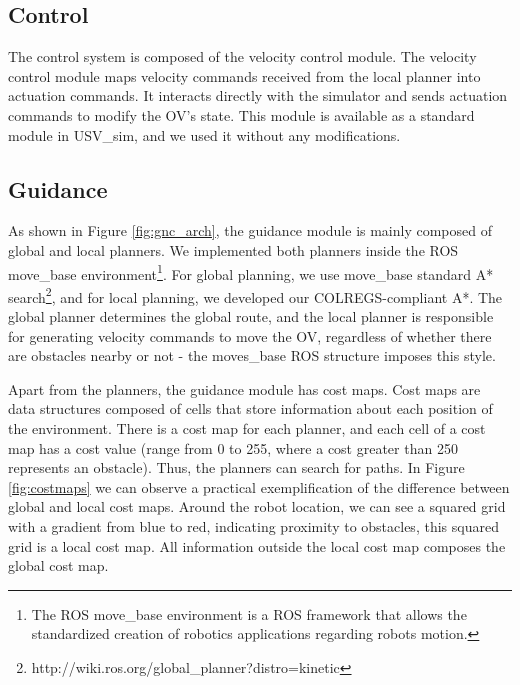     \subsection{Control}
    \label{sec:chap4_control}
    
        The control system is composed of the velocity control module. The velocity control module maps velocity commands received from the local planner into actuation commands. It interacts directly with the simulator and sends actuation commands to modify the \ac{OV}'s state.  This module is available as a standard module in USV\_sim, and we used it without any modifications.
        
    \subsection{Guidance}
    \label{sec:chap4_guidance}

        As shown in Figure \ref{fig:gnc_arch}, the guidance module is mainly composed of global and local planners. We implemented both planners inside the ROS move\_base environment\footnote{The ROS move\_base environment is a ROS framework that allows the standardized creation of robotics applications regarding robots motion.}. For global planning, we use move\_base standard A* search\footnote{http://wiki.ros.org/global\_planner?distro=kinetic}, and for local planning, we developed our \ac{COLREGS}-compliant A*. The global planner determines the global route, and the local planner is responsible for generating velocity commands to move the \ac{OV}, regardless of whether there are obstacles nearby or not - the moves\_base ROS structure imposes this style.
        
        Apart from the planners, the guidance module has cost maps. Cost maps are data structures composed of cells that store information about each position of the environment. There is a cost map for each planner, and each cell of a cost map has a cost value (range from 0 to 255, where a cost greater than 250 represents an obstacle). Thus, the planners can search for paths. In Figure \ref{fig:costmaps} we can observe a practical exemplification of the difference between global and local cost maps. Around the robot location, we can see a squared grid with a gradient from blue to red, indicating proximity to obstacles, this squared grid is a local cost map. All information outside the local cost map composes the global cost map.
        
